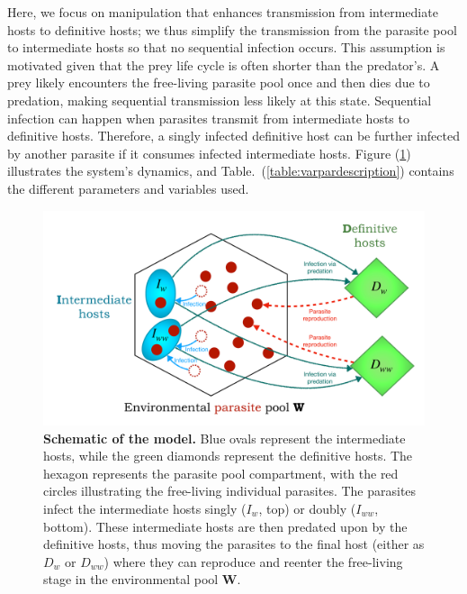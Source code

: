 \documentclass[a4paper]{scrartcl}
\begin{document}
Here, we focus on manipulation that enhances transmission from intermediate hosts to definitive hosts; we thus simplify the transmission from the parasite pool to intermediate hosts so that no sequential infection occurs. 
This assumption is motivated given that the prey life cycle is often shorter than the predator's. 
A prey likely encounters the free-living parasite pool once and then dies due to predation, making sequential transmission less likely at this state.
Sequential infection can happen when parasites transmit from intermediate hosts to definitive hosts. 
Therefore, a singly infected definitive host can be further infected by another parasite if it consumes infected intermediate hosts. 
Figure (\ref{fig:schematic}) illustrates the system's dynamics, and Table.~(\ref{table:varpardescription}) contains the different parameters and variables used.
%
\begin{figure}[ht!]
\captionsetup{format=plain}
\centering
\includegraphics[width=\textwidth]{Figures/schematic.pdf}
\caption{\textbf{Schematic of the model.} 
Blue ovals represent the intermediate hosts, while the green diamonds represent the definitive hosts.
The hexagon represents the parasite pool compartment, with the red circles illustrating the free-living individual parasites.
The parasites infect the intermediate hosts singly ($I_w$, top) or doubly ($I_{ww}$, bottom).
These intermediate hosts are then predated upon by the definitive hosts, thus moving the parasites to the final host (either as $D_w$ or $D_{ww}$) where they can reproduce and reenter the free-living stage in the environmental pool $\mathbf{W}$.
}
\label{fig:schematic}
\end{figure}
\end{document}
